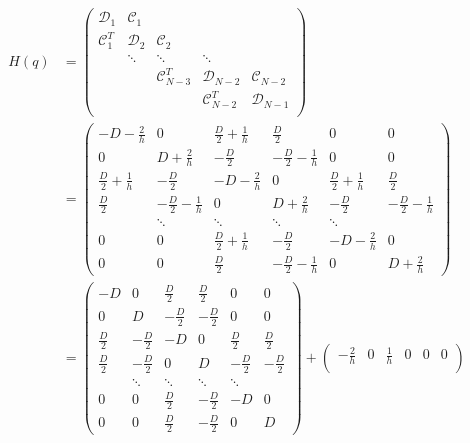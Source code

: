 \documentclass{article}
\begin{document}
\begin{align*}    
    H(q) & = \begin{pmatrix}
        \mathcal{D}_1 & \mathcal{C}_1 \\
        \mathcal{C}_1^T & \mathcal{D}_2 & \mathcal{C}_2 \\
        & \ddots & \ddots & \ddots & \\
        & & \mathcal{C}_{N-3}^T & \mathcal{D}_{N-2} & \mathcal{C}_{N-2} \\ 
        & & & \mathcal{C}_{N-2}^T & \mathcal{D}_{N-1} \\  
    \end{pmatrix} \\
    & = \begin{pmatrix}
        - D - \frac{2}{h} & 0 & \frac{D}{2} + \frac{1}{h} & \frac{D}{2} & 0 & 0\\
        0 & D + \frac{2}{h} & - \frac{D}{2} & - \frac{D}{2} - \frac{1}{h} & 0 & 0\\
        \frac{D}{2} + \frac{1}{h} & - \frac{D}{2} & - D - \frac{2}{h} & 0 & \frac{D}{2} + \frac{1}{h} & \frac{D}{2}\\
        \frac{D}{2} & - \frac{D}{2} - \frac{1}{h} & 0 & D + \frac{2}{h} & - \frac{D}{2} & - \frac{D}{2} - \frac{1}{h}\\
        & \ddots & \ddots & \ddots & \ddots \\
 0 & 0 & \frac{D}{2} + \frac{1}{h} & - \frac{D}{2} & - D - \frac{2}{h} & 0\\0 & 0 & \frac{D}{2} & - \frac{D}{2} - \frac{1}{h} & 0 & D + \frac{2}{h}
    \end{pmatrix} \\
    & = \begin{pmatrix}
        - D & 0 & \frac{D}{2} & \frac{D}{2} & 0 & 0\\
        0 & D & - \frac{D}{2} & - \frac{D}{2}  & 0 & 0\\
        \frac{D}{2} & - \frac{D}{2} & - D & 0 & \frac{D}{2}  & \frac{D}{2}\\
        \frac{D}{2} & - \frac{D}{2}  & 0 & D & - \frac{D}{2} & - \frac{D}{2} \\
        & \ddots & \ddots & \ddots & \ddots \\
 0 & 0 & \frac{D}{2} & - \frac{D}{2} & - D & 0\\0 & 0 & \frac{D}{2} & - \frac{D}{2}  & 0 & D
    \end{pmatrix} + \begin{pmatrix}
        - \frac{2}{h} & 0 & \frac{1}{h} & 0 & 0 & 0\\

\end{pmatrix}
\end{align*}
\end{document}
